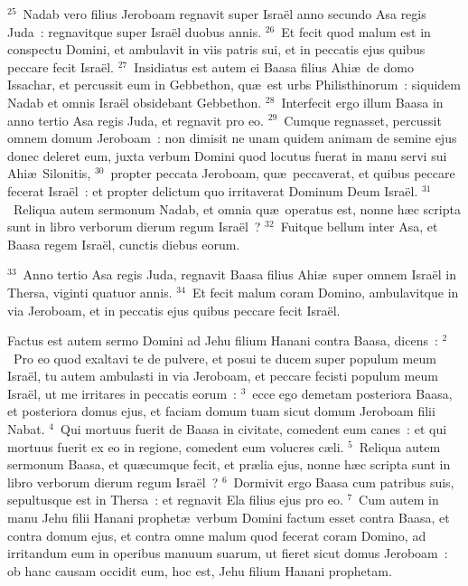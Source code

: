 ${}^{25}$~Nadab vero filius Jeroboam regnavit super Isra\"el anno secundo Asa regis Juda~: regnavitque super Isra\"el duobus annis.
${}^{26}$~Et fecit quod malum est in conspectu Domini, et ambulavit in viis patris sui, et in peccatis ejus quibus peccare fecit Isra\"el.
${}^{27}$~Insidiatus est autem ei Baasa filius Ahi\ae\ de domo Issachar, et percussit eum in Gebbethon, qu\ae\ est urbs Philisthinorum~: siquidem Nadab et omnis Isra\"el obsidebant Gebbethon.
${}^{28}$~Interfecit ergo illum Baasa in anno tertio Asa regis Juda, et regnavit pro eo.
${}^{29}$~Cumque regnasset, percussit omnem domum Jeroboam~: non dimisit ne unam quidem animam de semine ejus donec deleret eum, juxta verbum Domini quod locutus fuerat in manu servi sui Ahi\ae\ Silonitis,
${}^{30}$~propter peccata Jeroboam, qu\ae\ peccaverat, et quibus peccare fecerat Isra\"el~: et propter delictum quo irritaverat Dominum Deum Isra\"el.
${}^{31}$~Reliqua autem sermonum Nadab, et omnia qu\ae\ operatus est, nonne h\ae c scripta sunt in libro verborum dierum regum Isra\"el~?
${}^{32}$~Fuitque bellum inter Asa, et Baasa regem Isra\"el, cunctis diebus eorum.


${}^{33}$~Anno tertio Asa regis Juda, regnavit Baasa filius Ahi\ae\ super omnem Isra\"el in Thersa, viginti quatuor annis.
${}^{34}$~Et fecit malum coram Domino, ambulavitque in via Jeroboam, et in peccatis ejus quibus peccare fecit Isra\"el.

\bchapter
\lettrine[lines=3,image=true,loversize=0.05,lraise=-0.03]{F}{}actus est autem sermo Domini ad Jehu filium Hanani contra Baasa, dicens~:
${}^{2}$~Pro eo quod exaltavi te de pulvere, et posui te ducem super populum meum Isra\"el, tu autem ambulasti in via Jeroboam, et peccare fecisti populum meum Isra\"el, ut me irritares in peccatis eorum~:
${}^{3}$~ecce ego demetam posteriora Baasa, et posteriora domus ejus, et faciam domum tuam sicut domum Jeroboam filii Nabat.
${}^{4}$~Qui mortuus fuerit de Baasa in civitate, comedent eum canes~: et qui mortuus fuerit ex eo in regione, comedent eum volucres c\ae li.
${}^{5}$~Reliqua autem sermonum Baasa, et qu\ae cumque fecit, et pr\ae lia ejus, nonne h\ae c scripta sunt in libro verborum dierum regum Isra\"el~?
${}^{6}$~Dormivit ergo Baasa cum patribus suis, sepultusque est in Thersa~: et regnavit Ela filius ejus pro eo.
${}^{7}$~Cum autem in manu Jehu filii Hanani prophet\ae\ verbum Domini factum esset contra Baasa, et contra domum ejus, et contra omne malum quod fecerat coram Domino, ad irritandum eum in operibus manuum suarum, ut fieret sicut domus Jeroboam~: ob hanc causam occidit eum, hoc est, Jehu filium Hanani prophetam.


